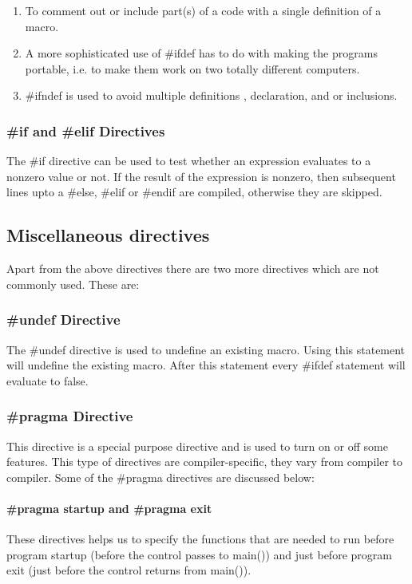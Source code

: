 \begin{enumerate}
    \item To comment out or include part(s) of a code with a single definition of a macro.
    \item A more sophisticated use of \#ifdef has to do with making the programs portable, i.e. to make them work on two totally different computers.
    \item \#ifndef is used to avoid multiple definitions , declaration, and or inclusions.
\end{enumerate}

\subsubsection{\#if and \#elif Directives}
The \#if directive can be used to test whether an expression evaluates to a nonzero value or not. If the result of the expression is nonzero, then subsequent lines upto a \#else, \#elif or \#endif are compiled, otherwise they are skipped.



\subsection{Miscellaneous directives}
Apart from the above directives there are two more directives which are not commonly used. These are: 

\subsubsection{\#undef Directive} 
The \#undef directive is used to undefine an existing macro. Using this statement will undefine the existing macro. After this statement every \#ifdef statement will evaluate to false. 

\subsubsection{\#pragma Directive}
This directive is a special purpose directive and is used to turn on or off some features. This type of directives are compiler-specific, \ie they vary from compiler to compiler. Some of the \#pragma directives are discussed below: 

\paragraph{\#pragma startup and \#pragma exit}
These directives helps us to specify the functions that are needed to run before program startup (before the control passes to main()) and just before program exit (just before the control returns from main()). 

